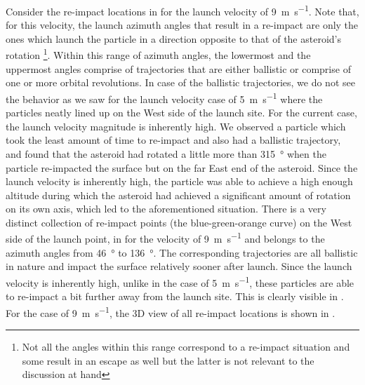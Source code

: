 \FloatBarrier
Consider the re-impact locations in  for the launch velocity of \SI{9}{\metre\per\second}. Note that, for this velocity, the launch azimuth angles that result in a re-impact are only the ones which launch the particle in a direction opposite to that of the asteroid's rotation \footnote{Not all the angles within this range correspond to a re-impact situation and some result in an escape as well but the latter is not relevant to the discussion at hand}. Within this range of azimuth angles, the lowermost and the uppermost angles comprise of trajectories that are either ballistic or comprise of one or more orbital revolutions. In case of the ballistic trajectories, we do not see the behavior as we saw for the launch velocity case of \SI{5}{\metre\per\second} where the particles neatly lined up on the West side of the launch site. For the current case, the launch velocity magnitude is inherently high. We observed a particle which took the least amount of time to re-impact and also had a ballistic trajectory, and found that the asteroid had rotated a little more than \SI{315}{\degree} when the particle re-impacted the surface but on the far East end of the asteroid. Since the launch velocity is inherently high, the particle was able to achieve a high enough altitude during which the asteroid had achieved a significant amount of rotation on its own axis, which led to the aforementioned situation.
%
\newline\newline
%
There is a very distinct collection of re-impact points (the blue-green-orange curve) on the West side of the launch point, in  for the velocity of \SI{9}{\metre\per\second} and belongs to the azimuth angles from \SI{46}{\degree} to \SI{136}{\degree}. The corresponding trajectories are all ballistic in nature and impact the surface relatively sooner after launch. Since the launch velocity is inherently high, unlike in the case of \SI{5}{\metre\per\second}, these particles are able to re-impact a bit further away from the launch site. This is clearly visible in . For the case of \SI{9}{\metre\per\second}, the 3D view of all re-impact locations is shown in .
%
\newline\newline
%

